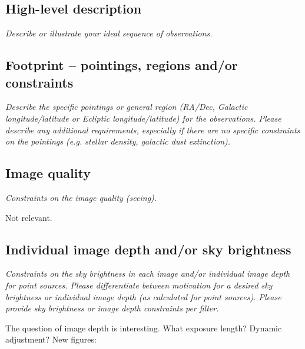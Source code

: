 \documentclass[11pt]{article}
\begin{document}
\subsection{High-level description}
\begin{footnotesize}
{\it Describe or illustrate your ideal sequence of observations.}
\end{footnotesize}

\vspace{.3in}


\subsection{Footprint -- pointings, regions and/or constraints}
\begin{footnotesize}{\it Describe the specific pointings or general region (RA/Dec, Galactic longitude/latitude or 
Ecliptic longitude/latitude) for the observations. Please describe any additional requirements, especially if there
are no specific constraints on the pointings (e.g. stellar density, galactic dust extinction).}
\end{footnotesize}

\subsection{Image quality}
\begin{footnotesize}{\it Constraints on the image quality (seeing).}\end{footnotesize}

Not relevant.

\subsection{Individual image depth and/or sky brightness}
\begin{footnotesize}{\it Constraints on the sky brightness in each image and/or individual image depth for point sources.
Please differentiate between motivation for a desired sky brightness or individual image depth (as 
calculated for point sources). Please provide sky brightness or image depth constraints per filter.}
\end{footnotesize}

The question of image depth is interesting.  What exposure length?
Dynamic adjustment?  New figures:
\end{document}
